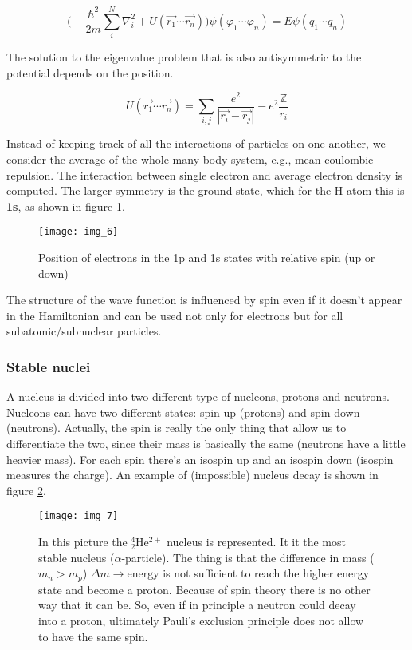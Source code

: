 	$$\bigg(-\frac{\hbar^2}{2m}\sum_{i}^{N}\nabla^2_i+U(\vec{r_1}\cdots\vec{r_n})\bigg)\psi(\varphi_1 \cdots\varphi_n)=E\psi(q_1 \cdots q_n)$$

	The solution to the eigenvalue problem that is also antisymmetric to the potential depends on the position.

	$$U(\vec{r_1}\cdots\vec{r_n})=\sum_{i,j}\frac{e^2}{|\vec{r_i}-\vec{r_j}|}-e^2\frac{\mathbb{Z}}{r_i}$$

	Instead of keeping track of all the interactions of particles on one another, we consider the average of the whole many-body system, e.g., mean coulombic repulsion.
	The interaction between single electron and average electron density is computed.
	The larger symmetry is the ground state, which for the H-atom this is \textbf{1s}, as shown in figure \ref{fig:spin1}.

	\begin{figure}[htbp!]
 		\centering
 		\texttt{[image: img\_6]}
 		\caption{Position of electrons in the 1p and 1s states with relative spin (up or down)}
 		\label{fig:spin1}
	\end{figure}

	The structure of the wave function is influenced by spin even if it doesn't appear in the Hamiltonian and can be used not only for electrons but for all subatomic/subnuclear particles.

		\subsubsection{Stable nuclei}
		A nucleus is divided into two different type of nucleons, protons and neutrons.
		Nucleons can have two different states: spin up (protons) and spin down (neutrons).
		Actually, the spin is really the only thing that allow us to differentiate the two, since their mass is basically the same (neutrons have a little heavier mass).
		For each spin there's an isospin up and an isospin down (isospin measures the charge).
		An example of (impossible) nucleus decay is shown in figure \ref{fig:decay}.

		\begin{figure}[htbp!]
 			\centering
 			\texttt{[image: img\_7]}
 			\caption{In this picture the $^4_2$He$^{2+}$ nucleus is represented.
								It it the most stable nucleus ($\alpha$-particle).
								The thing is that the difference in mass ($m_n > m_p$) $\Delta m \rightarrow \text{energy}$ is not sufficient to reach the higher energy state and become a proton.
								Because of spin theory there is no other way that it can be.
								So, even if in principle a neutron could decay into a proton, ultimately Pauli's exclusion principle does not allow to have the same spin.}
 			\label{fig:decay}
		\end{figure}

